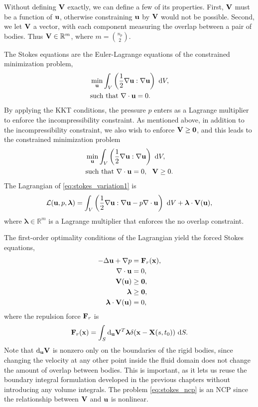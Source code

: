 Without defining ${\mathbf{V}}$ exactly, we can define a few of its properties. First, ${\mathbf{V}}$ must be a function of ${\mathbf{u}}$, otherwise constraining ${\mathbf{u}}$ by ${\mathbf{V}}$ would not be possible. Second, we let ${\mathbf{V}}$ a vector, with each component measuring the overlap between a pair of bodies. Thus ${\mathbf{V}}\in \mathbb{R}^m$, where $m=\binom{n_p}{2}$.

The Stokes equations are the Euler-Lagrange equations of the constrained minimization problem,
\begin{subequations}\label{eq:stokes_variation}
\begin{align*}
	 &\min_{{\mathbf{u}}} \int_{V} \left(\frac{1}{2}\nabla {\mathbf{u}} : \nabla {\mathbf{u}}  \right)~\text{d}V,\\
	 &\text{such that } \nabla\cdot{\mathbf{u}} = 0.
\end{align*}
\end{subequations}
By applying the KKT conditions, the pressure $p$ enters as a Lagrange multiplier to enforce the incompressibility constraint. As mentioned above, in addition to the incompressibility constraint, we also wish to enforce ${\mathbf{V}}\geq \mathbf{0}$, and this leads to the constrained minimization problem
 \begin{subequations}\label{eq:stokes_variation1}
\begin{align}
	 &\min_{{\mathbf{u}}} \int_{V} \left(\frac{1}{2}\nabla {\mathbf{u}} : \nabla {\mathbf{u}}  \right)~\text{d}V,\\
	 &\text{such that } \nabla\cdot{\mathbf{u}} = 0,~~{\mathbf{V}} \geq 0.
\end{align}
\end{subequations}
The Lagrangian of \eqref{eq:stokes_variation1} is
\[ \mathcal{L}({\mathbf{u}},  p, \bm{\lambda}) = \int_{V} \left(\frac{1}{2} \nabla{\mathbf{u}}:\nabla {\mathbf{u}}  - p\nabla\cdot{\mathbf{u}}\right)~\text{d}V+\bm{\lambda}\cdot{\mathbf{V}}({\mathbf{u}}),\]
where $\bm{\lambda}\in \mathbb{R}^m$ is a Lagrange multiplier that enforces the no overlap constraint.

The first-order optimality conditions of the Lagrangian yield the forced Stokes equations,
\begin{subequations}\label{eq:stokes_ncp}
\begin{align}
	-\Delta {\mathbf{u}} + \nabla p &=  {\mathbf{F}}_r({\mathbf{x}}),\\
	\nabla\cdot{\mathbf{u}} &= 0,\\
	{\mathbf{V}}({\mathbf{u}}) &\geq \mathbf{0},\\
	\bm{\lambda} &\geq \mathbf{0},\\
	\bm{\lambda}\cdot{\mathbf{V}}({\mathbf{u}}) &= 0,
\end{align}
\end{subequations}
where the repulsion force ${\mathbf{F}}_r$ is
\begin{equation}\label{eq:repulsion_force}{\mathbf{F}}_r({\mathbf{x}}) = \int_{S} \text{d}_{{\mathbf{u}}} {\mathbf{V}}^T \bm{\lambda}\delta({\mathbf{x}} - {\mathbf{X}}(s,t_0))~\text{d}S.\end{equation}
Note that $\text{d}_{{\mathbf{u}}}{\mathbf{V}}$ is nonzero only on the boundaries of the rigid bodies, since changing the velocity at any other point inside the fluid domain does not change the amount of overlap between bodies. This is important, as it lets us reuse the boundary integral formulation developed in the previous chapters without introducing any volume integrals. The problem \eqref{eq:stokes_ncp} is an NCP since the relationship between ${\mathbf{V}}$ and ${\mathbf{u}}$ is nonlinear. 

